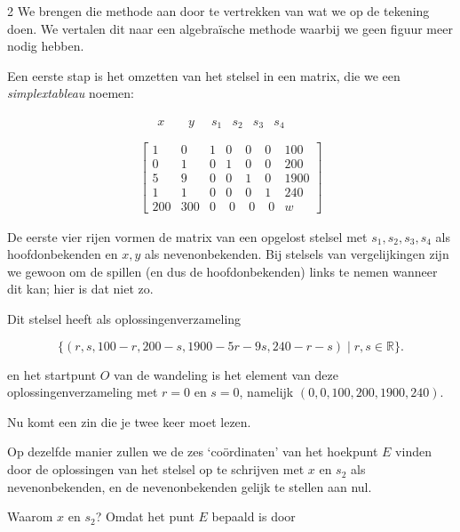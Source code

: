 \begin{multicols}{2}
	We brengen die methode aan door te vertrekken van wat we op de tekening doen. We vertalen dit naar een algebraïsche methode waarbij we geen figuur meer nodig hebben.
	
	
	Een eerste stap is het omzetten van het stelsel in een matrix, die we een  \emph{simplextableau} noemen:
	
	$$
	\begin{array}{l}
		
		\begin{array}{crrrrrr}
			& \;x & \;\;\;\;y & \;\;s_1 & s_2 & s_3 & s_4 \\ 
		\end{array}\\
		\left[
		\begin{array}{cccccc|c}
			1 &  0 &   1 &   0 &   0 &  0 & 100  \\
			0 &  1 &   0 &   1 &   0 &  0 & 200  \\
			5 &   9 &   0 &   0 &   1 & 0 &  1900 \\ 
			1 &   1 &   0 &   0 &   0 &  1 & 240 \\ \hline
			200 & 300 & 0 & \;0 & \;0 & \;0 & w 
		\end{array}
		\right]
	\end{array}
	$$
	
	De eerste vier rijen vormen de matrix van een opgelost stelsel met $s_1, s_2, s_3, s_4$ als hoofdonbekenden en $x, y$ als nevenonbekenden. Bij stelsels van vergelijkingen zijn we gewoon om de spillen (en dus de hoofdonbekenden) links te nemen wanneer dit kan; hier is dat niet zo.
	
	Dit stelsel heeft als oplossingenverzameling
	\begin{footnotesize}
		$$\big\{ (r,s, 100-r, 200-s, 1900-5r-9s, 240-r-s ) \mid r, s \in \mathbb{R} \big\} .$$
	\end{footnotesize}
	
	en het startpunt $O$ van de wandeling is het element van deze oplossingenverzameling met $r=0$ en $s=0$, namelijk $(0, 0, 100, 200, 1900, 240)$.
	
	Nu komt een zin die je twee keer moet lezen.
	
	Op dezelfde manier zullen we de zes `coördinaten' van het hoekpunt $E$ vinden door de oplossingen van het stelsel op te schrijven met $x$ en $s_2$ als nevenonbekenden, en de nevenonbekenden gelijk te stellen aan nul.
	
	Waarom $x$ en $s_2$? Omdat het punt $E$ bepaald is door 
	

\end{multicols}
